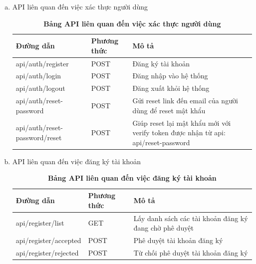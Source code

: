 \begin{enumerate}[a)]
  \item API liên quan đến việc xác thực người dùng


\begin{table}[H]
  \centering
  \caption{\bfseries \fontsize{12pt}{0pt}\selectfont Bảng API liên quan đến việc xác thực người dùng}
  \begin{tabularx}{0.9\textwidth}{
  | >{\raggedright\arraybackslash}X
  | >{\raggedright\arraybackslash}m{2cm}
  | >{\raggedright\arraybackslash}X|
  }
  \hline
  \bfseries Đường dẫn    &\bfseries Phương thức    &\bfseries Mô tả\\ \hline
  api/auth/register   &   POST  & Đăng ký tài khoản \\ \hline
  api/auth/login   &    POST    & Đăng nhập vào hệ thống \\ \hline
  api/auth/logout   &    POST    & Đăng xuất khỏi hệ thống \\ \hline
  api/auth/reset-password  &     POST   &  Gửi reset link đến email của người dùng để reset mật khẩu \\  \hline
  api/auth/reset-password/reset &   POST     & Giúp reset lại mật khẩu mới với verify token được nhận từ api: api/reset-password  \\ \hline

  \end{tabularx}
  \label{table_api_auth}
\end{table}

  \item API liên quan đến việc đăng ký tài khoản


\begin{table}[H]
  \centering
  \caption{\bfseries \fontsize{12pt}{0pt}\selectfont Bảng API liên quan đến việc đăng ký tài khoản}
  \begin{tabularx}{0.9\textwidth}{
  | >{\raggedright\arraybackslash}X
  | >{\raggedright\arraybackslash}m{2cm}
  | >{\raggedright\arraybackslash}X|
  }
  \hline
  \bfseries Đường dẫn    &\bfseries Phương thức    &\bfseries Mô tả\\ \hline
  api/register/list   &   GET  & Lấy danh sách các tài khoản đăng ký đang chờ phê duyệt \\ \hline
  api/register/accepted   &    POST    & Phê duyệt tài khoản đăng ký \\ \hline
  api/register/rejected  &     POST   &  Từ chối phê duyệt tài khoản đăng ký \\  \hline

  \end{tabularx}
  \label{table_api_register}
\end{table}


\end{enumerate}
